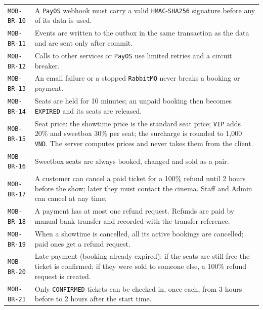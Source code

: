 \begin{longtable}{@{}P{0.23000\SRSWidth}P{0.77000\SRSWidth}@{}}
\texttt{MOB-\allowbreak{}BR-\allowbreak{}10} & A \texttt{Pay\allowbreak{}OS} webhook must carry a valid \texttt{HMAC}-\texttt{SHA256} signature before any of its data is used. \\[3pt]
\texttt{MOB-\allowbreak{}BR-\allowbreak{}11} & Events are written to the outbox in the same transaction as the data and are sent only after commit. \\[3pt]
\texttt{MOB-\allowbreak{}BR-\allowbreak{}12} & Calls to other services or \texttt{Pay\allowbreak{}OS} use limited retries and a circuit breaker. \\[3pt]
\texttt{MOB-\allowbreak{}BR-\allowbreak{}13} & An email failure or a stopped \texttt{Rabbit\allowbreak{}MQ} never breaks a booking or payment. \\[3pt]
\texttt{MOB-\allowbreak{}BR-\allowbreak{}14} & Seats are held for 10 minutes; an unpaid booking then becomes \texttt{EXPIRED} and its seats are released. \\[3pt]
\texttt{MOB-\allowbreak{}BR-\allowbreak{}15} & Seat price: the showtime price is the standard seat price; \texttt{VIP} adds 20\% and sweetbox 30\% per seat; the surcharge is rounded to 1,000 \texttt{VND}. The server computes prices and never takes them from the client. \\[3pt]
\texttt{MOB-\allowbreak{}BR-\allowbreak{}16} & Sweetbox seats are always booked, changed and sold as a pair. \\[3pt]
\texttt{MOB-\allowbreak{}BR-\allowbreak{}17} & A customer can cancel a paid ticket for a 100\% refund until 2 hours before the show; later they must contact the cinema. Staff and Admin can cancel at any time. \\[3pt]
\texttt{MOB-\allowbreak{}BR-\allowbreak{}18} & A payment has at most one refund request. Refunds are paid by manual bank transfer and recorded with the transfer reference. \\[3pt]
\texttt{MOB-\allowbreak{}BR-\allowbreak{}19} & When a showtime is cancelled, all its active bookings are cancelled; paid ones get a refund request. \\[3pt]
\texttt{MOB-\allowbreak{}BR-\allowbreak{}20} & Late payment (booking already expired): if the seats are still free the ticket is confirmed; if they were sold to someone else, a 100\% refund request is created. \\[3pt]
\texttt{MOB-\allowbreak{}BR-\allowbreak{}21} & Only \texttt{CONFIRME\allowbreak{}D} tickets can be checked in, once each, from 3 hours before to 2 hours after the start time. \\[3pt]

\end{longtable}
